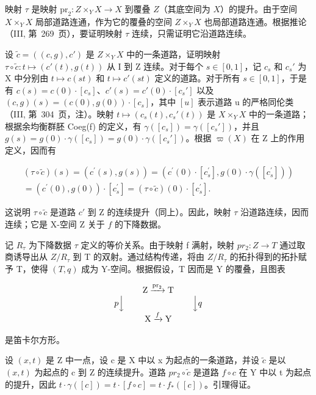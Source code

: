 映射 \(\tau\) 是映射 \(\mathrm{pr}_2\colon Z\times_Y X\to X\) 到覆叠 \(Z\)（其底空间为 \(X\)）的提升。由于空间 \(X\times_Y X\) 局部道路连通，作为它的覆叠的空间 \(Z\times_Y X\) 也局部道路连通。根据推论（III, 第~269~页），要证明映射 \(\tau\) 连续，只需证明它沿道路连续。

设 \(\widetilde{c} = ((c,g),c')\) 是 \(Z\times_{Y}X\) 中的一条道路，证明映射 \(\tau \circ \widetilde{c}\colon t\mapsto (c'(t),g(t))\) 从 I 到 Z 连续。对于每个 \(s\in [0,1]\)，记 \(c_s\) 和 \(c_s'\) 为 X 中分别由 \(t\mapsto c(st)\) 和 \(t\mapsto c'(st)\) 定义的道路。对于所有 \(s\in [0,1]\)，于是有 \(c(s) = c(0)\cdot [c_s]\)、\(c'(s) = c'(0)\cdot [c_s']\) 以及 \((c,g)(s) = (c(0),g(0))\cdot [c_s]\)，其中 \([u]\) 表示道路 u 的严格同伦类（III, 第~304~页，注）。映射 \(t\mapsto (c_s(t),c_s'(t))\) 是 \(X\times_{Y}X\) 中的一条道路；根据余均衡群胚 Coeg(f) 的定义，有 \(\gamma ([c_s]) = \gamma ([c_s'])\)，并且 \(g(s) = g(0)\cdot \gamma ([c_s]) = g(0)\cdot \gamma ([c_s'])\)。根据 \(\varpi (X)\) 在 Z 上的作用定义，因而有

\[
\begin{array}{r} (\tau \circ \widetilde {c}) (s) = (c ^ {\prime} (s), g (s)) = (c ^ {\prime} (0) \cdot [ c _ {s} ^ {\prime} ], g (0) \cdot \gamma ([ c _ {s} ^ {\prime} ])) \\ = (c ^ {\prime} (0), g (0)) \cdot [ c _ {s} ^ {\prime} ] = (\tau \circ \widetilde {c}) (0) \cdot [ c _ {s} ^ {\prime} ]. \end{array}
\]

这说明 \(\tau \circ \widetilde{c}\) 是道路 \(c'\) 到 Z 的连续提升（同上）。因此，映射 \(\tau\) 沿道路连续，因而连续；它是 X-空间 Z 关于 \(f\) 的下降数据。

记 \(R_{\tau}\) 为下降数据 \(\tau\) 定义的等价关系。由于映射 f 满射，映射 \(pr_{2}: Z \to T\) 通过取商诱导出从 \(Z/R_{\tau}\) 到 T 的双射。通过结构传递，将由 \(Z/R_{\tau}\) 的拓扑得到的拓扑赋予 T，使得 \((T,q)\) 成为 Y-空间。根据假设，T 因而是 Y 的覆叠，且图表

\[
\begin{array}{c} \mathrm{Z} \xrightarrow {\mathrm{pr} _ {2}} \mathrm{T} \\ p \Big \downarrow \qquad \qquad \qquad \qquad \Big \downarrow q \\ \mathrm{X} \xrightarrow {f} \mathrm{Y} \end{array}
\]

是笛卡尔方形。

设 \((x,t)\) 是 Z 中一点，设 c 是 X 中以 x 为起点的一条道路，并设 \(\widetilde{c}\) 是以 \((x,t)\) 为起点的 c 到 Z 的连续提升。道路 \(pr_{2} \circ \widetilde{c}\) 是道路 \(f \circ c\) 在 Y 中以 t 为起点的提升，因此 \(t \cdot \gamma([c]) = t \cdot [f \circ c] = t \cdot f_{*}([c])\)。引理得证。


